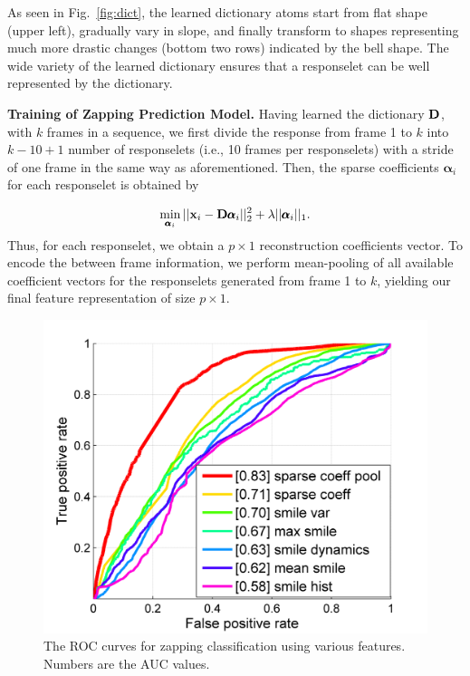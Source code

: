 \documentclass[twoside,leqno,twocolumn]{article}
\begin{document}
As seen in Fig.~\ref{fig:dict}, the learned dictionary atoms start from flat shape (upper left), gradually vary in slope, and finally transform to shapes representing much more drastic changes (bottom two rows) indicated by the bell shape. The wide variety of the learned dictionary ensures that a responselet can be well represented by the dictionary. 

\noindent \textbf{Training of Zapping Prediction Model.} Having learned the dictionary ${\bf D}$, with $k$ frames in a sequence, we first divide the response from frame 1 to $k$ into $k-10+1$ number of responselets (i.e., 10 frames per responselets) with a stride of one frame in the same way as aforementioned. Then, the sparse coefficients $\pmb\alpha_i$ for each responselet is obtained by

\begin{align}
\label{eq:solve_alpha}
\min_{\pmb\alpha_i} ||{\bf x}_i-{\bf D} \pmb\alpha_i||^2_2 +\lambda ||\pmb\alpha_i||_1.
\end{align}
Thus, for each responselet, we obtain a $p\times 1$ reconstruction coefficients vector. To encode the between frame information, we perform mean-pooling of all available coefficient vectors for the responselets generated from frame 1 to $k$, yielding our final feature representation of size $p\times 1$. 


\begin{figure}[!t]
	\centering
		\includegraphics[width=.8\columnwidth]{fig/cls_performance.png}
	\caption{The ROC curves for zapping classification using various features. Numbers are the AUC values.}
	\label{fig:cls_performance}
\end{figure}
\end{document}
